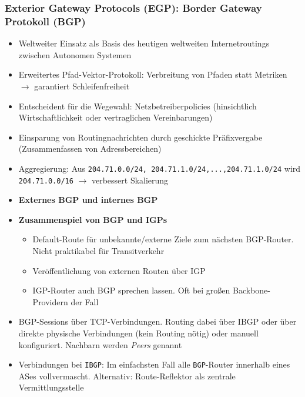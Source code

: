 \subsubsection{Exterior Gateway Protocols (EGP): Border Gateway Protokoll (BGP)}
\begin{itemize}
	\item Weltweiter Einsatz als Basis des heutigen weltweiten Internetroutings zwischen Autonomen Systemen
	\item Erweitertes Pfad-Vektor-Protokoll: Verbreitung von Pfaden statt Metriken \(\rightarrow\) garantiert Schleifenfreiheit
	\item Entscheident für die Wegewahl: Netzbetreiberpolicies (hinsichtlich Wirtschaftlichkeit oder vertraglichen Vereinbarungen)
	\item Einsparung von Routingnachrichten durch geschickte Präfixvergabe (Zusammenfassen von Adressbereichen)
	\item Aggregierung: Aus \texttt{204.71.0.0/24, 204.71.1.0/24,...,204.71.1.0/24} wird \texttt{204.71.0.0/16} \(\rightarrow\) verbessert Skalierung
	\item \textbf{Externes BGP und internes BGP}
	\item \textbf{Zusammenspiel von BGP und IGPs}
	\begin{itemize}
		\item Default-Route für unbekannte/externe Ziele zum nächsten BGP-Router. Nicht praktikabel für Transitverkehr
		\item Veröffentlichung von externen Routen über IGP
		\item IGP-Router auch BGP sprechen lassen. Oft bei großen Backbone-Providern der Fall
	\end{itemize}
	\item BGP-Sessions über TCP-Verbindungen. Routing dabei über IBGP oder über direkte physische Verbindungen (kein Routing nötig) oder manuell konfiguriert. Nachbarn werden \textit{Peers} genannt
	\item Verbindungen bei \texttt{IBGP}: Im einfachsten Fall alle \texttt{BGP}-Router innerhalb eines ASes vollvermascht. Alternativ: Route-Reflektor als zentrale Vermittlungsstelle

\end{itemize}
